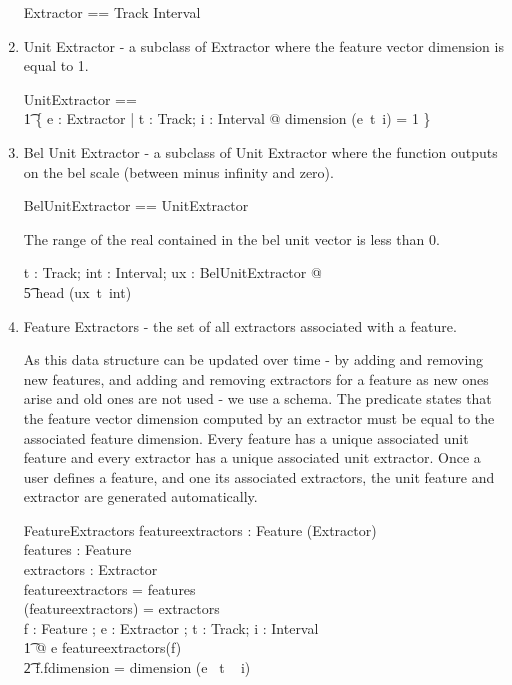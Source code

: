 \documentclass[11pt]{article}
\begin{document}
\begin{enumerate}
\begin{zed}
	Extractor ==  Track \fun Interval \fun \FV 
\end{zed}

\item \textsf{Unit Extractor} - a subclass of Extractor where the feature vector dimension is equal to 1.

\begin{zed}
	UnitExtractor ==  \\
\t1		\{ e : Extractor | \forall t : Track; i : Interval @ dimension (e~t~i) = 1 \}  
\end{zed}

\item \textsf{Bel Unit Extractor} - a subclass of Unit Extractor where the function outputs on the bel scale (between minus infinity and zero). 

\begin{zed}
	BelUnitExtractor ==  UnitExtractor
\end{zed}

The range of the real contained in the bel unit vector is less than 0. 

\begin{zed}
		\forall t : Track; int : Interval; ux : BelUnitExtractor   @  \\
		\t5 head (ux~t~int)  
\end{zed}


\item \textsf{Feature Extractors} - the set of  all extractors associated with a feature.

As this data structure can be updated over time -  by adding and removing new features, and adding and removing extractors for a feature as new ones arise and old ones are not used - we use a schema. The  predicate states that the feature vector dimension computed by an extractor must be equal to the associated feature dimension. Every feature has a unique associated unit feature  and every extractor has a unique associated unit extractor. Once a user defines a feature, and one its associated extractors, the unit feature and extractor are generated automatically.  

\begin{schema}{FeatureExtractors}
	featureextractors : Feature \pfun (\power Extractor) \\
	features : \power Feature \\
	extractors : \power Extractor \\
\where
	\dom featureextractors = features \\
	\bigcup (\ran featureextractors) = extractors \\
	\forall f : Feature ; e :  Extractor ; t : Track; i : Interval \\
	\t1 @ e \in featureextractors(f)  \implies  \\
	\t2 f.fdimension = dimension (e~ t ~ i) \\
\end{schema}


\end{enumerate}
\end{document}
